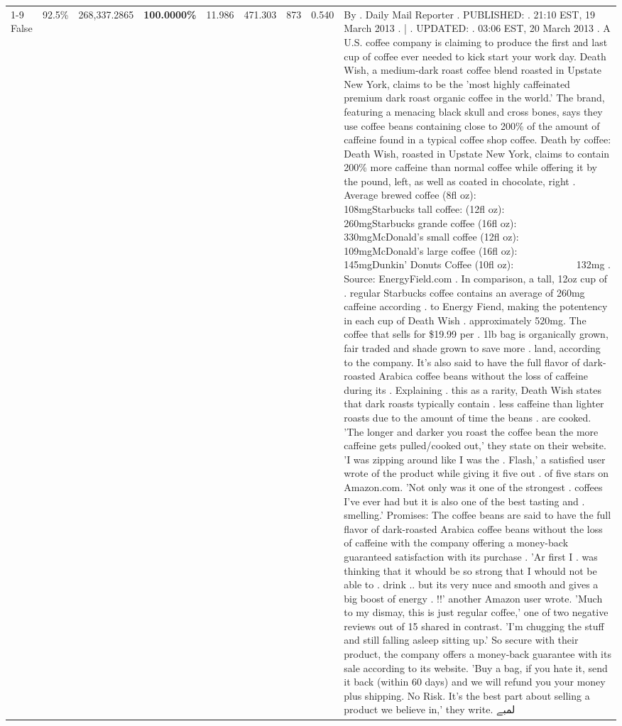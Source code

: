 \begin{table}[H]
{\begin{tabular}{lllrlllll}
\cline{1-9}
False & 92.5\% & \color{red} 268,337.2865 & \bfseries \color{red} 100.0000\% & 11.986 & 471.303 & 873 & 0.540 & By . Daily Mail Reporter . PUBLISHED: . 21:10 EST, 19 March 2013 . | . UPDATED: . 03:06 EST, 20 March 2013 . A U.S. coffee company is claiming to produce the first and last cup of coffee ever needed to kick start your work day. Death Wish, a medium-dark roast coffee blend roasted in Upstate New York, claims to be the 'most highly caffeinated premium dark roast organic coffee in the world.' The brand, featuring a menacing black skull and cross bones, says they use coffee beans containing close to 200\% of the amount of caffeine found in a typical coffee shop coffee. Death by coffee: Death Wish, roasted in Upstate New York, claims to contain 200\% more caffeine than normal coffee while offering it by the pound, left, as well as coated in chocolate, right . Average brewed coffee (8fl oz):              108mgStarbucks tall coffee: (12fl oz):                260mgStarbucks grande coffee (16fl oz):         330mgMcDonald's small coffee (12fl oz):           109mgMcDonald's large coffee (16fl oz):           145mgDunkin' Donuts Coffee (10fl oz):             132mg . Source: EnergyField.com . In comparison, a tall, 12oz cup of . regular Starbucks coffee contains an average of 260mg caffeine according . to Energy Fiend, making the potentency in each cup of Death Wish . approximately 520mg. The coffee that sells for \$19.99 per . 1lb bag is organically grown, fair traded and shade grown to save more . land, according to the company. It's also said to have the full flavor of dark-roasted Arabica coffee beans without the loss of caffeine during its . Explaining . this as a rarity, Death Wish states that dark roasts typically contain . less caffeine than lighter roasts due to the amount of time the beans . are cooked. 'The longer and darker you roast the coffee bean the more caffeine gets pulled/cooked out,' they state on their website. 'I was zipping around like I was the . Flash,' a satisfied user wrote of the product while giving it five out . of five stars on Amazon.com. 'Not only was it one of the strongest . coffees I've ever had but it is also one of the best tasting and . smelling.’ Promises: The coffee beans are said to have the full flavor of dark-roasted Arabica coffee beans without the loss of caffeine with the company offering a money-back guaranteed satisfaction with its purchase . 'Ar first I . was thinking that it whould be so strong that I whould not be able to . drink .. but its very nuce and smooth and gives a big boost of energy . !!' another Amazon user wrote. 'Much to my dismay, this is just regular coffee,' one of two negative reviews out of 15 shared in contrast. 'I'm chugging the stuff and still falling asleep sitting up.' So secure with their product, the company offers a money-back guarantee with its sale according to its website. 'Buy a bag, if you hate it, send it back (within 60 days) and we will refund you your money plus shipping. No Risk. It’s the best part about selling a product we believe in,' they write. لمبے \\

\end{tabular}}
\end{table}
